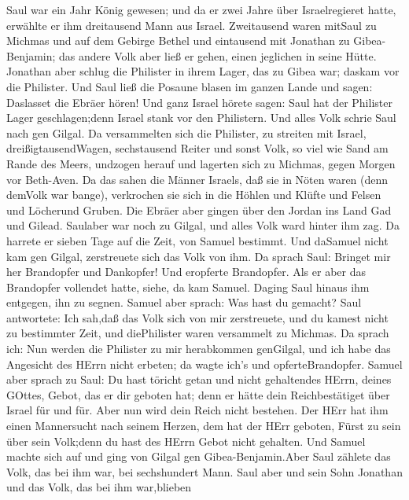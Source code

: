  Saul war ein Jahr König gewesen; und da er zwei Jahre über
Israelregieret hatte,  erwählte er ihm dreitausend Mann aus
Israel. Zweitausend waren mitSaul zu Michmas und auf dem Gebirge Bethel
und eintausend mit Jonathan zu Gibea-Benjamin; das andere Volk aber ließ
er gehen, einen jeglichen in seine Hütte.  Jonathan aber
schlug die Philister in ihrem Lager, das zu Gibea war; daskam vor die
Philister. Und Saul ließ die Posaune blasen im ganzen Lande und sagen:
Daslasset die Ebräer hören!  Und ganz Israel hörete sagen:
Saul hat der Philister Lager geschlagen;denn Israel stank vor den
Philistern. Und alles Volk schrie Saul nach gen Gilgal.  Da
versammelten sich die Philister, zu streiten mit Israel,
dreißigtausendWagen, sechstausend Reiter und sonst Volk, so viel wie
Sand am Rande des Meers, undzogen herauf und lagerten sich zu Michmas,
gegen Morgen vor Beth-Aven.  Da das sahen die Männer
Israels, daß sie in Nöten waren (denn demVolk war bange), verkrochen sie
sich in die Höhlen und Klüfte und Felsen und Löcherund Gruben.
 Die Ebräer aber gingen über den Jordan ins Land Gad und
Gilead. Saulaber war noch zu Gilgal, und alles Volk ward hinter ihm zag.
 Da harrete er sieben Tage auf die Zeit, von Samuel
bestimmt. Und daSamuel nicht kam gen Gilgal, zerstreuete sich das Volk
von ihm.  Da sprach Saul: Bringet mir her Brandopfer und
Dankopfer! Und eropferte Brandopfer.  Als er aber das
Brandopfer vollendet hatte, siehe, da kam Samuel. Daging Saul hinaus ihm
entgegen, ihn zu segnen.  Samuel aber sprach: Was hast du
gemacht? Saul antwortete: Ich sah,daß das Volk sich von mir zerstreuete,
und du kamest nicht zu bestimmter Zeit, und diePhilister waren
versammelt zu Michmas.  Da sprach ich: Nun werden die
Philister zu mir herabkommen genGilgal, und ich habe das Angesicht des
HErrn nicht erbeten; da wagte ich's und opferteBrandopfer. 
Samuel aber sprach zu Saul: Du hast töricht getan und nicht gehaltendes
HErrn, deines GOttes, Gebot, das er dir geboten hat; denn er hätte dein
Reichbestätiget über Israel für und für.  Aber nun wird
dein Reich nicht bestehen. Der HErr hat ihm einen Mannersucht nach
seinem Herzen, dem hat der HErr geboten, Fürst zu sein über sein
Volk;denn du hast des HErrn Gebot nicht gehalten.  Und
Samuel machte sich auf und ging von Gilgal gen Gibea-Benjamin.Aber Saul
zählete das Volk, das bei ihm war, bei sechshundert Mann. 
Saul aber und sein Sohn Jonathan und das Volk, das bei ihm war,blieben
